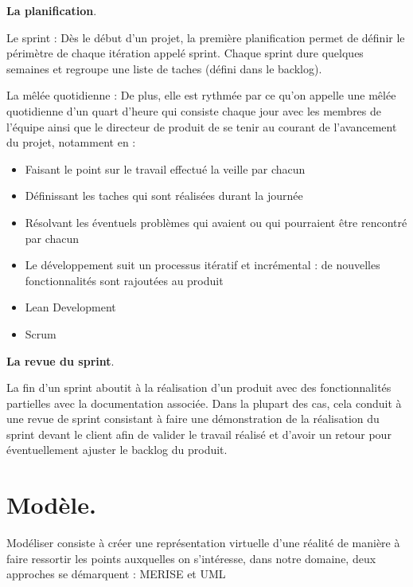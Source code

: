 	\textbf{La planification}.
	
Le sprint : Dès le début d’un projet, la première planification permet de définir le périmètre de chaque itération appelé sprint. Chaque sprint dure quelques semaines et regroupe une liste de taches (défini dans le backlog).
 
La mêlée quotidienne : De plus, elle est rythmée par ce qu’on appelle une mêlée quotidienne d’un quart d’heure qui consiste chaque jour avec les membres de l’équipe ainsi que le directeur de produit de se tenir au courant de l’avancement du projet, notamment en : 

\begin{itemize}[label=\textbullet, font=\LARGE \color{blue}] 
	\item  Faisant le point sur le travail effectué la veille par chacun 
	\item  Définissant les taches qui sont réalisées durant la journée
	\item  Résolvant les éventuels problèmes qui avaient ou qui pourraient être rencontré par chacun 
	\item  Le développement suit un processus itératif et incrémental : de nouvelles fonctionnalités sont rajoutées au produit
	\item  Lean Development
	\item  Scrum
\end{itemize}

\textbf{La revue du sprint}.

La fin d’un sprint aboutit à la réalisation d’un produit avec des fonctionnalités partielles avec la documentation associée. Dans la plupart des cas, cela conduit à une revue de sprint consistant à faire une démonstration de la réalisation du sprint devant le client afin de valider le travail réalisé et d’avoir un retour pour éventuellement ajuster le backlog du produit.

\section{Modèle.}

Modéliser consiste à créer une représentation virtuelle d’une réalité de manière à faire ressortir les points auxquelles on s’intéresse, dans notre domaine, deux approches se démarquent : MERISE et UML

